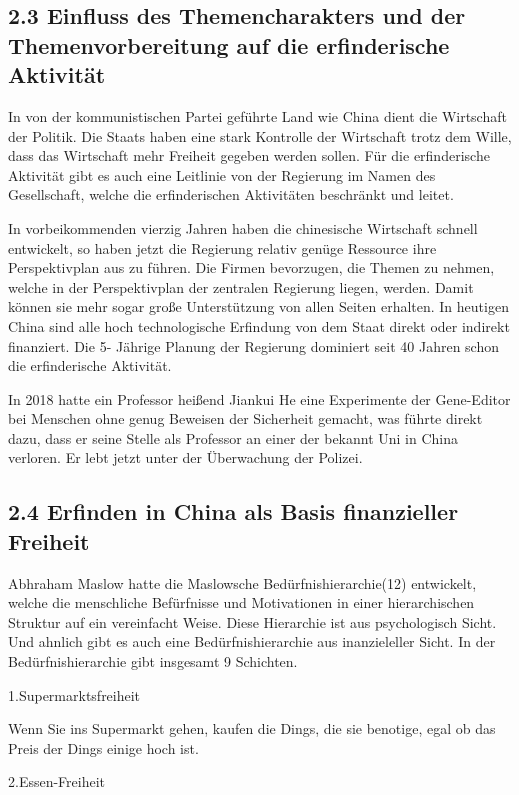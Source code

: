 \documentclass[11pt,a4paper]{article}
\begin{document}
\subsection{2.3 Einfluss des Themencharakters und der Themenvorbereitung auf
  die erfinderische Aktivität} 

In von der kommunistischen Partei geführte Land wie China dient die Wirtschaft
der Politik. Die Staats haben eine stark Kontrolle der Wirtschaft trotz dem
Wille, dass das Wirtschaft mehr Freiheit gegeben werden sollen. Für die
erfinderische Aktivität gibt es auch eine Leitlinie von der Regierung im Namen
des Gesellschaft, welche die erfinderischen Aktivitäten beschränkt und leitet.

In vorbeikommenden vierzig Jahren haben die chinesische Wirtschaft schnell
entwickelt, so haben jetzt die Regierung relativ genüge Ressource ihre
Perspektivplan aus zu führen. Die Firmen bevorzugen, die Themen zu nehmen,
welche in der Perspektivplan der zentralen Regierung liegen, werden. Damit
können sie mehr sogar große Unterstützung von allen Seiten erhalten. In
heutigen China sind alle hoch technologische Erfindung von dem Staat direkt
oder indirekt finanziert. Die 5- Jährige Planung der Regierung dominiert seit
40 Jahren schon die erfinderische Aktivität.

In 2018 hatte ein Professor heißend Jiankui He eine Experimente der
Gene-Editor bei Menschen ohne genug Beweisen der Sicherheit gemacht, was
führte direkt dazu, dass er seine Stelle als Professor an einer der bekannt
Uni in China verloren. Er lebt jetzt unter der Überwachung der Polizei.

\subsection{2.4 Erfinden in China als Basis finanzieller Freiheit}

Abhraham Maslow hatte die Maslowsche Bedürfnishierarchie(12) entwickelt,
welche die menschliche Befürfnisse und Motivationen  in einer hierarchischen
Struktur auf ein vereinfacht Weise. Diese Hierarchie ist aus psychologisch
Sicht. Und ahnlich gibt es auch eine Bedürfnishierarchie aus inanzieleller
Sicht. In der Bedürfnishierarchie gibt insgesamt 9 Schichten.

1.Supermarktsfreiheit

Wenn Sie ins Supermarkt gehen, kaufen die Dings, die sie benotige, egal ob das
Preis der Dings einige hoch ist.

2.Essen-Freiheit
\end{document}
